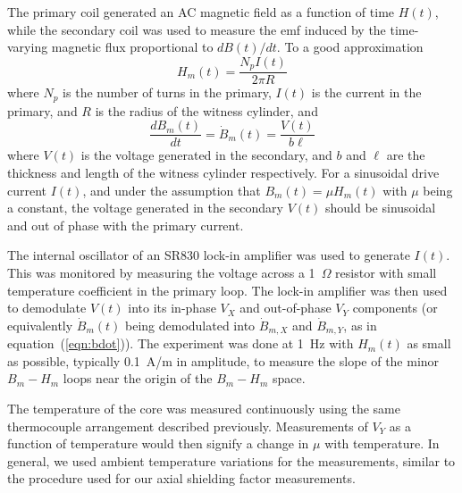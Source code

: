 


The primary coil generated an AC magnetic field as a function of time
$H(t)$, while the secondary coil was used to measure the emf induced
by the time-varying magnetic flux proportional to $dB(t)/dt$.  To a
good approximation
\begin{equation}
H_m(t)=\frac{N_pI(t)}{2\pi R}
\end{equation}
where $N_p$ is the number of turns in the primary, $I(t)$ is the
current in the primary, and $R$ is the radius of the witness cylinder,
and
\begin{equation}
\frac{dB_m(t)}{dt}=\dot{B}_m(t)=\frac{V(t)}{b\ell}
\label{eqn:bdot}
\end{equation}
where $V(t)$ is the voltage generated in the secondary, and $b$ and
$\ell$ are the thickness and length of the witness cylinder
respectively.  For a sinusoidal drive current $I(t)$, and under the
assumption that $B_m(t)=\mu H_m(t)$ with $\mu$ being a constant, the
voltage generated in the secondary $V(t)$ should be sinusoidal and out
of phase with the primary current.

The internal oscillator of an SR830 lock-in amplifier was used to
generate $I(t)$.  This was monitored by measuring the voltage across a
1~$\Omega$ resistor with small temperature coefficient in the primary
loop. The lock-in amplifier was then used to demodulate $V(t)$ into
its in-phase $V_X$ and out-of-phase $V_Y$ components (or equivalently
$\dot{B}_m(t)$ being demodulated into $\dot{B}_{m,X}$ and
$\dot{B}_{m,Y}$, as in equation~(\ref{eqn:bdot})).  The experiment was
done at 1~Hz with $H_m(t)$ as small as possible, typically 0.1~A/m in
amplitude, to measure the slope of the minor $B_m-H_m$ loops near the
origin of the $B_m-H_m$ space.

The temperature of the core was measured continuously using the same
thermocouple arrangement described previously. Measurements of $V_Y$
as a function of temperature would then signify a change in $\mu$ with
temperature.  In general, we used ambient temperature variations for
the measurements, similar to the procedure used for our axial
shielding factor measurements.


